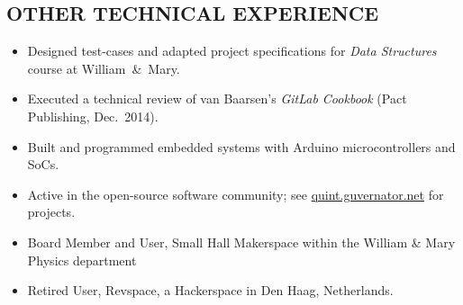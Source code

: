 \documentclass{res}     %
\begin{document}
\begin{resume}
\section{OTHER TECHNICAL EXPERIENCE}
\vspace{5mm}
\begin{itemize}[leftmargin=5mm]
\item Designed test-cases and adapted project specifications for \emph{Data Structures} course at William~\&~Mary.
\item Executed a technical review of van Baarsen's \emph{GitLab Cookbook} (Pact Publishing, Dec.\ 2014).
\item Built and programmed embedded systems with Arduino microcontrollers and SoCs.
\item Active in the open-source software community; see \url{quint.guvernator.net} for projects.
\item Board Member and User, Small Hall Makerspace within the William \& Mary Physics department %
\item Retired User, Revspace, a Hackerspace in Den Haag, Netherlands.
\end{itemize}


\end{resume}
\end{document}
